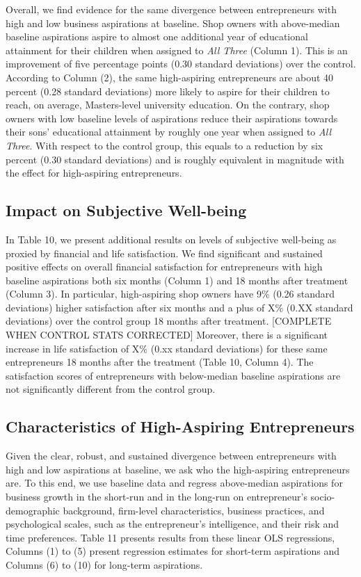 \documentclass[11.5pt]{article}
\begin{document}
Overall, we find evidence for the same divergence between entrepreneurs with high and low business aspirations at baseline. Shop owners with above-median baseline aspirations aspire to almost one additional year of educational attainment for their children when assigned to \emph{All Three} (Column 1). This is an improvement of five percentage points (0.30 standard deviations) over the control. According to Column (2), the same high-aspiring entrepreneurs are about 40 percent (0.28 standard deviations) more likely to aspire for their children to reach, on average, Masters-level university education. On the contrary, shop owners with low baseline levels of aspirations reduce their aspirations towards their sons' educational attainment by roughly one year when assigned to \emph{All Three}. With respect to the control group, this equals to a reduction by six percent (0.30 standard deviations) and is roughly equivalent in magnitude with the effect for high-aspiring entrepreneurs.

\subsection{Impact on Subjective Well-being}

In Table 10, we present additional results on levels of subjective well-being as proxied by financial and life satisfaction. We find significant and sustained positive effects on overall financial satisfaction for entrepreneurs with high baseline aspirations both six months (Column 1) and 18 months after treatment (Column 3). In particular, high-aspiring shop owners have 9\% (0.26 standard deviations) higher satisfaction after six months and a plus of X\% (0.XX standard deviations) over the control group 18 months after treatment. [\textcolor[rgb]{1.00,0.00,0.00}{COMPLETE WHEN CONTROL STATS CORRECTED}] Moreover, there is a significant increase in life satisfaction of X\% (0.xx standard deviations) for these same entrepreneurs 18 months after the treatment (Table 10, Column 4). The satisfaction scores of entrepreneurs with below-median baseline aspirations are not significantly different from the control group.

\subsection{Characteristics of High-Aspiring Entrepreneurs}

Given the clear, robust, and sustained divergence between entrepreneurs with high and low aspirations at baseline, we ask who the high-aspiring entrepreneurs are. To this end, we use baseline data and regress above-median aspirations for business growth in the short-run and in the long-run on entrepreneur's socio-demographic background, firm-level characteristics, business practices, and psychological scales, such as the entrepreneur's intelligence, and their risk and time preferences. Table 11 presents results from these linear OLS regressions, Columns (1) to (5) present regression estimates for short-term aspirations and Columns (6) to (10) for long-term aspirations.
\end{document}

